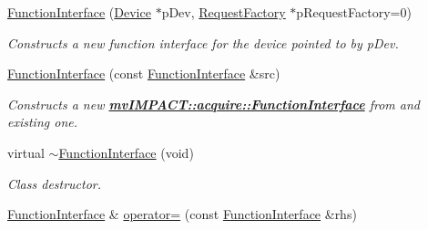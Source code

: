 \begin{DoxyCompactItemize}
\item 
\hyperlink{classmv_i_m_p_a_c_t_1_1acquire_1_1_function_interface_aeb3e2612fd93d61ac176da74f235a0eb}{Function\+Interface} (\hyperlink{classmv_i_m_p_a_c_t_1_1acquire_1_1_device}{Device} $\ast$p\+Dev, \hyperlink{classmv_i_m_p_a_c_t_1_1acquire_1_1_request_factory}{Request\+Factory} $\ast$p\+Request\+Factory=0)
\begin{DoxyCompactList}\small\item\em Constructs a new function interface for the device pointed to by {\itshape p\+Dev}. \end{DoxyCompactList}\item 
\hyperlink{classmv_i_m_p_a_c_t_1_1acquire_1_1_function_interface_a875c9c5693422ca7b7a3d284b029134e}{Function\+Interface} (const \hyperlink{classmv_i_m_p_a_c_t_1_1acquire_1_1_function_interface}{Function\+Interface} \&src)
\begin{DoxyCompactList}\small\item\em Constructs a new {\bfseries \hyperlink{classmv_i_m_p_a_c_t_1_1acquire_1_1_function_interface}{mv\+I\+M\+P\+A\+C\+T\+::acquire\+::\+Function\+Interface}} from and existing one. \end{DoxyCompactList}\item 
\hypertarget{classmv_i_m_p_a_c_t_1_1acquire_1_1_function_interface_ad5050198e319bb23b3f4db71dbddf8fb}{virtual \hyperlink{classmv_i_m_p_a_c_t_1_1acquire_1_1_function_interface_ad5050198e319bb23b3f4db71dbddf8fb}{$\sim$\+Function\+Interface} (void)}\label{classmv_i_m_p_a_c_t_1_1acquire_1_1_function_interface_ad5050198e319bb23b3f4db71dbddf8fb}

\begin{DoxyCompactList}\small\item\em Class destructor. \end{DoxyCompactList}\item 
\hypertarget{classmv_i_m_p_a_c_t_1_1acquire_1_1_function_interface_a697ea6ae2fce0f864fff73aa8e0fc056}{\hyperlink{classmv_i_m_p_a_c_t_1_1acquire_1_1_function_interface}{Function\+Interface} \& \hyperlink{classmv_i_m_p_a_c_t_1_1acquire_1_1_function_interface_a697ea6ae2fce0f864fff73aa8e0fc056}{operator=} (const \hyperlink{classmv_i_m_p_a_c_t_1_1acquire_1_1_function_interface}{Function\+Interface} \&rhs)}\label{classmv_i_m_p_a_c_t_1_1acquire_1_1_function_interface_a697ea6ae2fce0f864fff73aa8e0fc056}


\end{DoxyCompactItemize}

